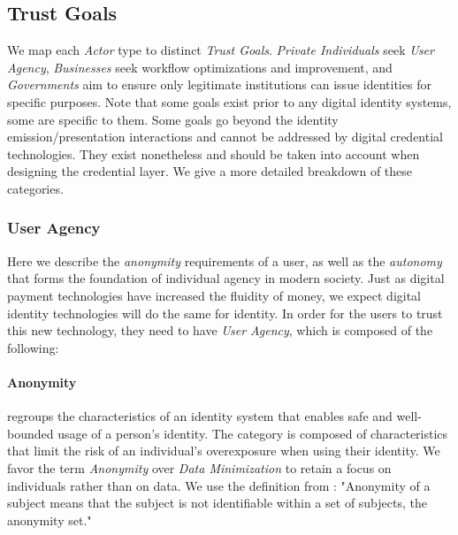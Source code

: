 \subsection{Trust Goals}
\label{subsub:trust_goals}

\vspace{1em}


We map each \emph{Actor} type to distinct \emph{Trust Goals}. \emph{Private Individuals} seek \emph{User Agency}, \emph{Businesses} seek workflow optimizations and improvement, and \emph{Governments} aim to ensure only legitimate institutions can issue identities for specific purposes.
Note that some goals exist prior to any digital identity systems, some are specific to them. Some goals go beyond the identity emission/presentation interactions and cannot be addressed by digital credential technologies. 
They exist nonetheless and should be taken into account when designing the credential layer. We give a more detailed breakdown of these categories.


\subsubsection{User Agency} 

Here we describe the \emph{anonymity} requirements of a user, as well as the \emph{autonomy} that forms the foundation of individual agency in modern society.
Just as digital payment technologies have increased the fluidity of money, we expect digital identity technologies will do the same for identity. 
In order for the users to trust this new technology, they need to have \emph{User Agency}, which is composed of the following:

\paragraph{Anonymity} regroups the characteristics of an identity system that enables safe and well-bounded usage of a person's identity. The category is composed of characteristics that limit the risk of an individual's overexposure when using their identity. We favor the term \emph{Anonymity} over \emph{Data Minimization} to retain a focus on individuals rather than on data. We use the definition from \cite{ph10}: "Anonymity of a subject means that the subject is not identifiable within a set of
subjects, the anonymity set."

